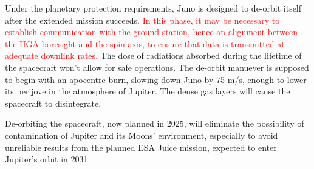 Under the planetary protection requirements, Juno is designed to de-orbit itself after the extended mission succeeds. \textcolor{red}{In this phase, it may be necessary to establish communication with the ground station, hence an alignment between the HGA boresight and the spin-axis, to ensure that data is transmitted at adequate downlink rates.} The dose of radiations absorbed during the lifetime of the spacecraft won't allow for safe operations. The de-orbit manuever is supposed to begin with an apocentre burn, slowing down Juno by 75 m/s, enough to lower its perijove in the atmosphere of Jupiter. The dense gas layers will cause the spacecraft to disintegrate.

De-orbiting the spacecraft, now planned in 2025, will eliminate the possibility of contamination of Jupiter and its Moons' environment, especially to avoid unreliable results from the planned ESA Juice mission, expected to enter Jupiter's orbit in 2031. \cite{NASA2} \cite{NASA1}